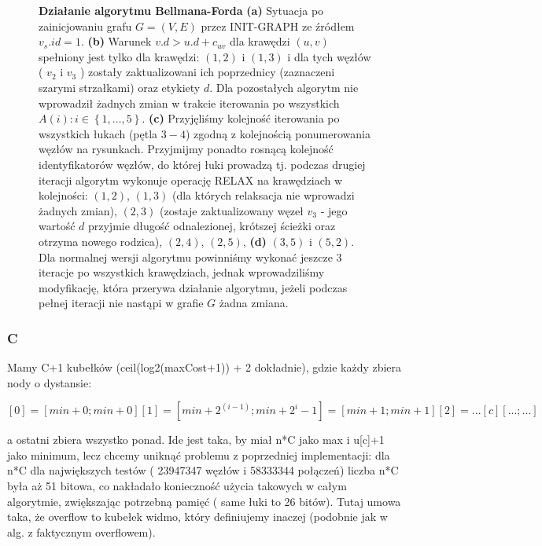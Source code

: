 \begin{figure}[!htbp]
\begin{subfigure}[b]{0.3\textwidth}
		\caption{}
	\end{subfigure}
	\caption{\textbf{Działanie algorytmu Bellmana-Forda} \textbf{(a)} Sytuacja po zainicjowaniu grafu $G = \left( V, E \right)$ przez \textsf{INIT-GRAPH} ze źródłem $v_{s}.id = 1$. \textbf{(b)} Warunek $ v.d > u.d + c_{uv} $ dla krawędzi $ \left( u, v \right) $ spełniony jest tylko dla krawędzi: $ \left( 1, 2 \right) $ i $ \left( 1, 3 \right) $ i dla tych węzłów ( $v_{2}$ i $v_{3}$ ) zostały zaktualizowani ich poprzednicy (zaznaczeni szarymi strzałkami) oraz etykiety $d$. Dla pozostałych algorytm nie wprowadził żadnych zmian w trakcie iterowania po wszystkich $ A \left( i \right) : i \in \left\{ 1, \ldots, 5\right\}$. \textbf{(c)} Przyjęliśmy kolejność iterowania po wszystkich łukach (pętla $3-4$) zgodną z kolejnością ponumerowania węzłów na rysunkach. Przyjmijmy ponadto rosnącą kolejność identyfikatorów węzłów, do której łuki prowadzą tj. podczas drugiej iteracji algorytm wykonuje operację \textsf{RELAX} na krawędziach w kolejności: $ \left( 1, 2 \right) $, $ \left( 1, 3 \right) $ (dla których relaksacja nie wprowadzi żadnych zmian), $ \left( 2, 3 \right) $ (zostaje zaktualizowany węzeł $v_{3}$ - jego wartość $d$ przyjmie długość odnalezionej, krótszej ścieżki oraz otrzyma nowego rodzica), $ \left( 2, 4 \right) $, $ \left( 2, 5 \right) $, \textbf{(d)} $ \left( 3, 5 \right) $ i $ \left( 5, 2 \right) $. Dla normalnej wersji algorytmu powinniśmy wykonać jeszcze 3 iteracje po wszystkich krawędziach, jednak wprowadziliśmy modyfikację, która przerywa działanie algorytmu, jeżeli podczas pełnej iteracji nie nastąpi w grafie $G$ żadna zmiana.} \label{fig:exampleBellmanFord}
\end{figure}

\subsubsection{C}

Mamy C+1 kubełków (ceil(log2(maxCost+1)) + 2 dokładnie), gdzie każdy zbiera nody o dystansie:

$[0] = [min+0;min+0]
[1] = [min+2^(i-1);min+2^i-1] = [min+1;min+1]
[2] = ...
[c] [... ; ...]$

a ostatni zbiera wszystko ponad. Ide jest taka, by miał n*C jako max i u[c]+1 jako minimum, lecz chcemy uniknąć problemu z poprzedniej implementacji: dla n*C dla największych testów ( 23947347 węzłów i 58333344 połączeń) liczba n*C była aż 51 bitowa, co nakładało konieczność użycia takowych w całym algorytmie, zwiększając potrzebną pamięć ( same łuki to 26 bitów). Tutaj umowa taka, że overflow to kubełek widmo, który definiujemy inaczej (podobnie jak w alg. z faktycznym overflowem).


